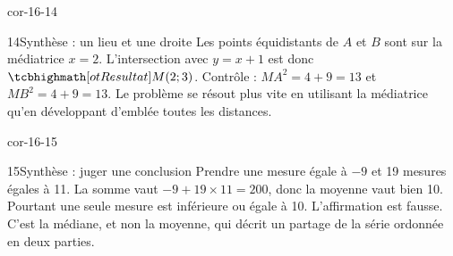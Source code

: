 \begin{blocLivre}{cor-16-14}
\begin{corrige}{14}{Synthèse : un lieu et une droite}
Les points équidistants de $A$ et $B$ sont sur la médiatrice $x=2$. L’intersection avec $y=x+1$ est donc $\res{M(2;3)}$. Contrôle : $MA^2=4+9=13$ et $MB^2=4+9=13$. Le problème se résout plus vite en utilisant la médiatrice qu’en développant d’emblée toutes les distances.
\label{fig-cor-16-14}
\end{corrige}
\end{blocLivre}
\begin{blocLivre}{cor-16-15}
\begin{corrige}{15}{Synthèse : juger une conclusion}
Prendre une mesure égale à $-9$ et 19 mesures égales à 11. La somme vaut $-9+19\times11=200$, donc la moyenne vaut bien 10. Pourtant une seule mesure est inférieure ou égale à 10. L’affirmation est fausse. C’est la médiane, et non la moyenne, qui décrit un partage de la série ordonnée en deux parties.
\end{corrige}
\end{blocLivre}
